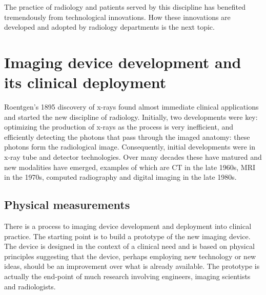 \documentclass[
]{book}
\begin{document}
The practice of radiology and patients served by this discipline has benefited tremendously from technological innovations. How these innovations are developed and adopted by radiology departments is the next topic.

\hypertarget{imaging-device-development-and-its-clinical-deployment}{%
\section{Imaging device development and its clinical deployment}\label{imaging-device-development-and-its-clinical-deployment}}

Roentgen's 1895 discovery of x-rays found almost immediate clinical applications and started the new discipline of radiology. Initially, two developments were key: optimizing the production of x-rays as the process is very inefficient, and efficiently detecting the photons that pass through the imaged anatomy: these photons form the radiological image. Consequently, initial developments were in x-ray tube and detector technologies. Over many decades these have matured and new modalities have emerged, examples of which are CT in the late 1960s, MRI in the 1970s, computed radiography and digital imaging in the late 1980s.

\hypertarget{physical-measurements}{%
\subsection{Physical measurements}\label{physical-measurements}}

There is a process to imaging device development and deployment into clinical practice. The starting point is to build a prototype of the new imaging device. The device is designed in the context of a clinical need and is based on physical principles suggesting that the device, perhaps employing new technology or new ideas, should be an improvement over what is already available. The prototype is actually the end-point of much research involving engineers, imaging scientists and radiologists.
\end{document}
